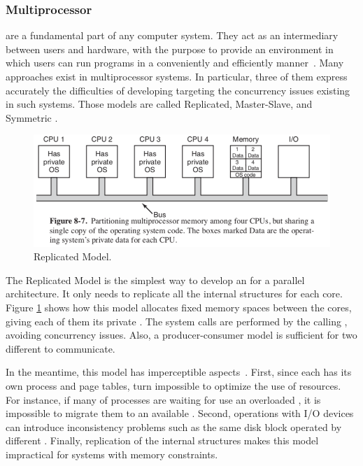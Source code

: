 		\subsubsection{Multiprocessor \oses}
		\label{sec.multiprocessor-os}

			\oses are a fundamental part of any computer system.
			They act as an intermediary between users and hardware, with the
			purpose to provide an environment in which users can run programs
			in a conveniently and efficiently manner~\cite{Silberschatz:9ed}.
			Many \os approaches exist in multiprocessor systems.
			In particular, three of them express accurately the difficulties
			of developing \oses targeting the concurrency issues existing in
			such systems.
			Those models are called Replicated, Master-Slave, and Symmetric \os.

			\begin{figure}[h]
				\centering
				\includegraphics[width=.8\textwidth]{images/replicated-os.png}

				\caption{
					Replicated \os Model.
				}\par
				\label{fig.replicated-os}
			\end{figure}

			The Replicated Model is the simplest way to develop an \os for a
			parallel architecture.
			It only needs to replicate all the internal \os structures for each core.
			Figure \ref{fig.replicated-os} shows how this model allocates fixed memory spaces
			between the cores, giving each of them its private \os.
			The system calls are performed by the calling \cpu, avoiding concurrency issues.
			Also, a producer-consumer model is sufficient for two different \cpus to communicate.

			In the meantime, this model has imperceptible aspects~\cite{tanenbaum:4ed}.
			First, since each \cpu has its own process and page tables, turn impossible
			to optimize the use of resources.
			For instance, if many of processes are waiting for use an overloaded \cpu,
			it is impossible to migrate them to an available \cpu.
			Second, operations with I/O devices can introduce inconsistency problems
			such as the same disk block operated by different \cpus.
			Finally, replication of the internal \os structures makes this model
			impractical for systems with memory constraints.

